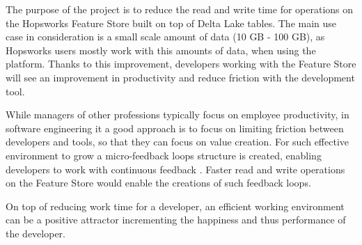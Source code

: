 The purpose of the project is to reduce the read and write time for operations on the Hopsworks Feature Store built on top of Delta Lake tables. The main use case in consideration is a small scale amount of data (10 GB - 100 GB), as Hopsworks users mostly work with this amounts of data, when using the platform. Thanks to this improvement, developers working with the Feature Store will see an improvement in productivity and reduce friction with the development tool.

While managers of other professions typically focus on employee productivity, in software engineering it a good approach is to focus on limiting friction between developers and tools, so that they can focus on value creation. For such effective environment to grow a micro-feedback loops structure is created, enabling developers to work with continuous feedback \cite{cochranMaximizingDeveloperEffectiveness2021}. Faster read and write operations on the Feature Store would enable the creations of such feedback loops.

On top of reducing work time for a developer, an efficient working environment can be a positive attractor \cite{graziotinTheoryAffectSoftware2016} incrementing the happiness and thus performance of the developer.